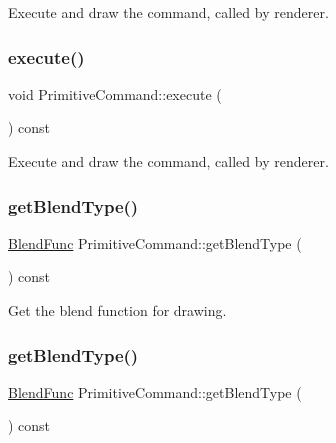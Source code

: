 Execute and draw the command, called by renderer. \mbox{\label{classPrimitiveCommand_aeac9906f9e9ea410c5cc701c17be80fd}} 
\subsubsection{\texorpdfstring{execute()}{execute()}\hspace{0.1cm}{\footnotesize\ttfamily [2/2]}}
{\footnotesize\ttfamily void Primitive\+Command\+::execute (\begin{DoxyParamCaption}{ }\end{DoxyParamCaption}) const}

Execute and draw the command, called by renderer. \mbox{\label{classPrimitiveCommand_a132bf1c144f322b06dce2db6924ebab3}} 
\subsubsection{\texorpdfstring{get\+Blend\+Type()}{getBlendType()}\hspace{0.1cm}{\footnotesize\ttfamily [1/2]}}
{\footnotesize\ttfamily \hyperlink{structBlendFunc}{Blend\+Func} Primitive\+Command\+::get\+Blend\+Type (\begin{DoxyParamCaption}{ }\end{DoxyParamCaption}) const\hspace{0.3cm}{\ttfamily [inline]}}

Get the blend function for drawing. \mbox{\label{classPrimitiveCommand_a132bf1c144f322b06dce2db6924ebab3}} 
\subsubsection{\texorpdfstring{get\+Blend\+Type()}{getBlendType()}\hspace{0.1cm}{\footnotesize\ttfamily [2/2]}}
{\footnotesize\ttfamily \hyperlink{structBlendFunc}{Blend\+Func} Primitive\+Command\+::get\+Blend\+Type (\begin{DoxyParamCaption}{ }\end{DoxyParamCaption}) const\hspace{0.3cm}{\ttfamily [inline]}}


